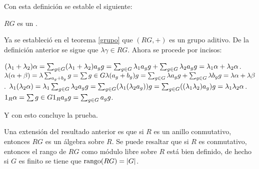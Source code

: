Con esta definición se estable el siguiente:
\begin{teorema}
$RG$ es un .
\end{teorema}
\begin{proof*}
Ya se estableció en el teorema \ref{grupo} que $(RG,+)$ es un grupo aditivo. De la definición anterior se sigue que $\lambda\gamma \in RG$. Ahora se procede por incisos: 
\begin{bulletList}
\newItem $(\lambda_1+\lambda_2)\alpha = \sum_{g \in G} (\lambda_1+\lambda_2)a_gg = \sum_{g \in G} \lambda_1 a_{g} g + \sum_{g \in G} \lambda_2 a_{g} g = \lambda_1\alpha + \lambda_2\alpha$.
\newItem $\lambda(\alpha + \beta) = \lambda\sum_{a_g+b_g}g = \sum{g \in G}\lambda(a_g+b_g)g = \sum_{g \in G} \lambda a_{g} g + \sum_{g \in G} \lambda b_{g} g = \lambda\alpha + \lambda\beta$.
\newItem  $\lambda_1(\lambda_2\alpha) = \lambda_1\sum_{g \in G} \lambda_2 a_{g} g = \sum_{g\in G}(\lambda_1(\lambda_2 a_g))g = \sum_{g\in G}((\lambda_1\lambda_2)a_g)g = \lambda_1\lambda_2\alpha$.
\newItem $1_R\alpha = \sum{g \in G}1_Ra_gg = \sum_{g \in G} a_{g} g$.
\end{bulletList}
Y con esto concluye la prueba. \qedhere
\end{proof*}
Una extensión del resultado anterior es que si $R$ es un anillo conmutativo, entonces $RG$ es un álgebra sobre $R$. Se puede resaltar que si $R$ es conmutativo,  entonces el rango de $RG$ como módulo libre sobre $R$ está bien definido, de hecho si $G$ es finito se tiene que $\operatorname{rango}(RG) = |G|$.

